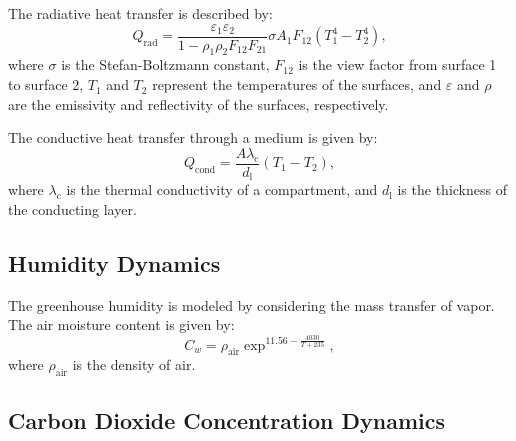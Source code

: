 \documentclass[conference]{IEEEtran}
\begin{document}
The radiative heat transfer is described by:
\begin{equation}
    Q_{\text{rad}} = \frac{\varepsilon_1  \varepsilon_2}{1 - \rho_1  \rho_2  F_{12}  F_{21}}  \sigma  A_1  F_{12}  \left( T_1^4 - T_2^4 \right),
\end{equation}
where \(\sigma \) is the Stefan-Boltzmann constant, \(F_{12}\) is the view factor from surface 1 to surface 2, \(T_1\) and \(T_2\) represent the temperatures of the surfaces, and \(\varepsilon \) and \(\rho \) are the emissivity and reflectivity of the surfaces, respectively.

The conductive heat transfer through a medium is given by:
\begin{equation}
    Q_{\text{cond}} = \frac{A \lambda_{\text{c}}}{d_\text{l}} (T_1 - T_2),
\end{equation}
where \(\lambda_{\text{c}} \) is the thermal conductivity of a compartment, and \(d_{\text{l}}\) is the thickness of the conducting layer.

\subsection{Humidity Dynamics}\label{subsec:humidity}

The greenhouse humidity is modeled by considering the mass transfer of vapor. The air moisture content is given by:
\begin{equation}
    C_w = \rho_{\text{air}} \exp^{11.56 - \frac{4030}{T + 235}},
\end{equation}
where \(\rho_{\text{air}}\) is the density of air.


\subsection{Carbon Dioxide Concentration Dynamics}
\end{document}
